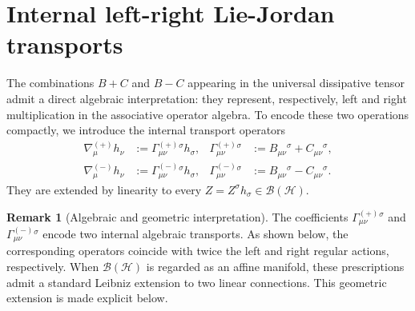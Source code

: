 \documentclass[notitlepage,aip,reprint,onecolumn]{revtex4-1}
\theoremstyle{definition}
\newtheorem{remark}[theorem]{Remark}
\begin{document}
\section{Internal left-right Lie-Jordan transports}\label{Sec:InternalTransports}

The combinations \(B+C\) and \(B-C\) appearing in the universal dissipative tensor admit a direct algebraic interpretation: they represent, respectively, left and right multiplication in the associative operator algebra. To encode these two operations compactly, we introduce the internal transport operators
\begin{subequations}\label{eq:nabla-plus-minus}
\begin{align}
    \nabla^{(+)}_\mu h_\nu
    &:=
    \Gamma^{(+)}_{\mu\nu}{}^\sigma h_\sigma,
    &
    \Gamma^{(+)}_{\mu\nu}{}^\sigma
    &:=
    B_{\mu\nu}{}^\sigma
    +
    C_{\mu\nu}{}^\sigma,
    \label{eq:nabla-plus}
    \\
    \nabla^{(-)}_\mu h_\nu
    &:=
    \Gamma^{(-)}_{\mu\nu}{}^\sigma h_\sigma,
    &
    \Gamma^{(-)}_{\mu\nu}{}^\sigma
    &:=
    B_{\mu\nu}{}^\sigma
    -
    C_{\mu\nu}{}^\sigma.
    \label{eq:nabla-minus}
\end{align}
\end{subequations}
They are extended by linearity to every
\(Z=Z^\sigma h_\sigma\in\mathcal B(\mathcal H)\).

\begin{remark}[Algebraic and geometric interpretation]
The coefficients \(\Gamma^{(+)}_{\mu\nu}{}^\sigma\) and \(\Gamma^{(-)}_{\mu\nu}{}^\sigma\) encode two internal algebraic transports. As shown below, the corresponding operators coincide with twice the left and right regular actions, respectively. When \(\mathcal B(\mathcal H)\) is regarded as an affine manifold, these prescriptions admit a standard Leibniz extension to two linear  connections.
This geometric extension is made explicit below.
\end{remark}
\end{document}
